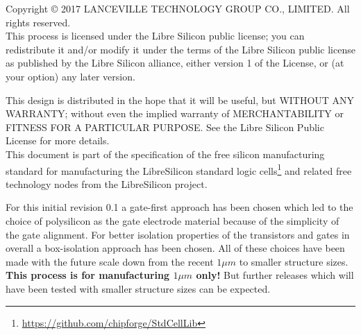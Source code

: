 Copyright © 2017 LANCEVILLE TECHNOLOGY GROUP CO., LIMITED. All rights reserved. \\

This process is licensed under the Libre Silicon public license; you can redistribute it and/or modify it under the terms of the Libre Silicon public license
as published by the Libre Silicon alliance, either version 1 of the License, or (at your option) any later version.

This design is distributed in the hope that it will be useful, but WITHOUT ANY WARRANTY; without even the implied warranty of MERCHANTABILITY or FITNESS FOR A PARTICULAR PURPOSE.
See the Libre Silicon Public License for more details. \\

This document is part of the specification of the free silicon manufacturing standard for manufacturing the LibreSilicon standard logic cells\footnote{\url{https://github.com/chipforge/StdCellLib}} and related free technology nodes from the LibreSilicon project.

For this initial revision 0.1 a gate-first approach has been chosen which led to the choice of polysilicon as the gate electrode material because of the simplicity of the gate alignment.
For better isolation properties of the transistors and gates in overall a box-isolation approach has been chosen.
All of these choices have been made with the future scale down from the recent $1 \mu m$ to smaller structure sizes.
\textbf{This process is for manufacturing $1 \mu m$ only!}
But further releases which will have been tested with smaller structure sizes can be expected.
